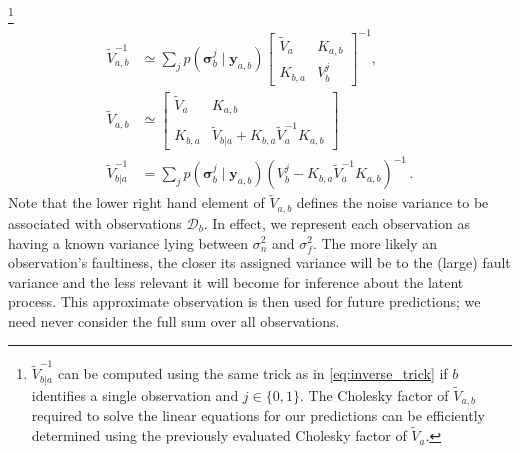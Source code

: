 \documentclass[twoside]{article}
\newcommand{\deq}{=}
\newcommand{\given}{\!\ensuremath{\mid}\!}
\newcommand{\cm}[1]{\ensuremath{\mathcal{#1}}}
\newcommand{\bm}[1]{\ensuremath{\mathbf{#1}}}
\newcommand{\data}{\ensuremath{\cm{D}}}
\newcommand{\vect}[1]{\bm{#1}}
\newcommand{\vy}{\vect{y}}
\newcommand{\vs}{\vect{\sigma}}
\newcommand{\fPr}{p}
\newcommand{\Prob}[2]{\fPr(#1 \given #2 )}
\begin{document}
\footnote{
$\tilde{V}^{-1}_{b|a}$ can be computed using the same trick as in \eqref{eq:inverse_trick} if
$b$ identifies a single observation and $j\in\{0,1\}$. The Cholesky factor of $\tilde{V}_{a,b}$ required to solve the linear equations for our predictions can be efficiently determined 
\citep{OsborneAnon}
using the previously evaluated Cholesky factor of $\tilde{V}_{a}$.
}
\begin{align*}
\tilde{V}^{-1}_{a,b} &\simeq \sum_j \Prob{\vs^j_{b}}{\vy_{a,b}} \begin{bmatrix}
 \tilde{V}_a & K_{a,b}
\\
 K_{b,a} & V^j_b
\end{bmatrix}^{-1},
\nonumber\\
\tilde{V}_{a,b} & \simeq
\begin{bmatrix}
 \tilde{V}_a & K_{a,b}\\
 K_{b,a} & \tilde{V}_{b|a} + K_{b,a} \tilde{V}_a^{-1} K_{a,b}
\end{bmatrix}\\
% 
 \tilde{V}^{-1}_{b|a} & \deq \sum_j \Prob{\vs^j_{b}}{\vy_{a,b}} (V^j_b -K_{b,a} \tilde{V}_a^{-1}K_{a,b})^{-1}\,.
\end{align*}
 Note that the
lower right hand element of $\tilde{V}_{a,b}$ defines the noise
variance to be associated with observations $\data_b$. In effect, we represent
each observation as having a known variance lying between
$\sigma_n^2$ and $\sigma_f^2$. The more likely an observation's
faultiness, the closer its assigned variance will be to the (large)
fault variance and the less relevant it will become for inference
about the latent process. This approximate observation is then used
for future predictions; we need never consider the full sum over all
observations. 
\end{document}
